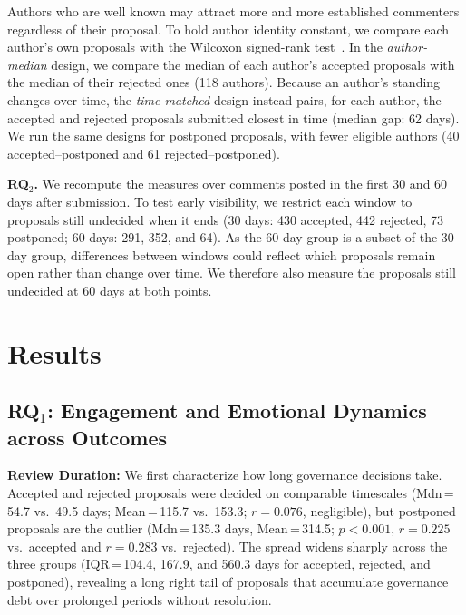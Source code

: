 \documentclass[conference]{IEEEtran}
\begin{document}
Authors who are well known may attract more and more established commenters regardless of their proposal. To hold author identity constant, we compare each author's own proposals with the Wilcoxon signed-rank test~\cite{wilcoxon1945individual}. In the \emph{author-median} design, we compare the median of each author's accepted proposals with the median of their rejected ones (118 authors). Because an author's standing changes over time, the \emph{time-matched} design instead pairs, for each author, the accepted and rejected proposals submitted closest in time (median gap: 62 days). We run the same designs for postponed proposals, with fewer eligible authors (40 accepted--postponed and 61 rejected--postponed).

\textbf{RQ$_2$.} We recompute the measures over comments posted in the first 30 and 60 days after submission. To test early visibility, we restrict each window to proposals still undecided when it ends (30 days: 430 accepted, 442 rejected, 73 postponed; 60 days: 291, 352, and 64). As the 60-day group is a subset of the 30-day group, differences between windows could reflect which proposals remain open rather than change over time. We therefore also measure the proposals still undecided at 60 days at both points.

\section{Results}

\subsection{RQ$_1$: Engagement and Emotional Dynamics across Outcomes}
\label{sec:rq1}

\textbf{Review Duration:} We first characterize how long governance decisions take. Accepted and rejected proposals were decided on comparable timescales (Mdn\,=\,54.7 vs.\ 49.5 days; Mean\,=\,115.7 vs.\ 153.3; $r = 0.076$, negligible), but postponed proposals are the outlier (Mdn\,=\,135.3 days, Mean\,=\,314.5; $p {<} 0.001$, $r = 0.225$ vs.\ accepted and $r = 0.283$ vs.\ rejected). The spread widens sharply across the three groups (IQR\,=\,104.4, 167.9, and 560.3 days for accepted, rejected, and postponed), revealing a long right tail of proposals that accumulate governance debt over prolonged periods without resolution.
\end{document}
